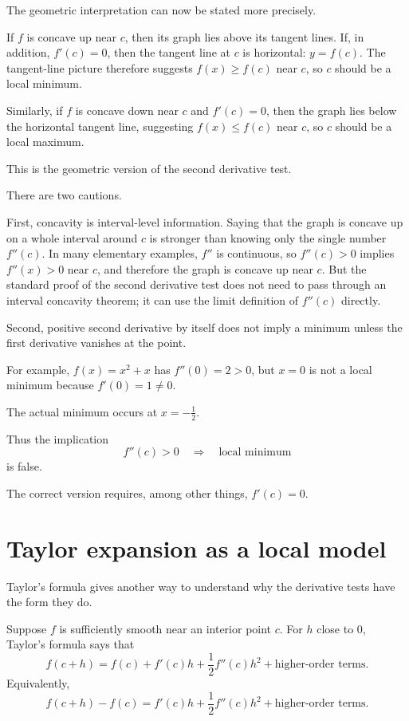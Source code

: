 \documentclass{essay}
\begin{document}
The geometric interpretation can now be stated more precisely.

If \(f\) is concave up near \(c\), then its graph lies above its tangent lines. If, in addition, \(f'(c)=0\), then the tangent line at \(c\) is horizontal: \(y=f(c)\). The tangent-line picture therefore suggests \(f(x)\geq f(c)\) near \(c\), so \(c\) should be a local minimum.

Similarly, if \(f\) is concave down near \(c\) and \(f'(c)=0\), then the graph lies below the horizontal tangent line, suggesting \(f(x)\leq f(c)\) near \(c\), so \(c\) should be a local maximum.

This is the geometric version of the second derivative test.

There are two cautions.

First, concavity is interval-level information. Saying that the graph is concave up on a whole interval around \(c\) is stronger than knowing only the single number \(f''(c)\). In many elementary examples, \(f''\) is continuous, so \(f''(c)>0\) implies \(f''(x)>0\) near \(c\), and therefore the graph is concave up near \(c\). But the standard proof of the second derivative test does not need to pass through an interval concavity theorem; it can use the limit definition of \(f''(c)\) directly.

Second, positive second derivative by itself does not imply a minimum unless the first derivative vanishes at the point.

For example, \(f(x)=x^2+x\) has \(f''(0)=2>0\), but \(x=0\) is not a local minimum because \(f'(0)=1\neq0\).

The actual minimum occurs at \(x=-\frac12\).

Thus the implication
\[
f''(c)>0
\quad\Longrightarrow\quad
\text{local minimum}
\]
is false.

The correct version requires, among other things, \(f'(c)=0\).

\section{Taylor expansion as a local model}

Taylor's formula gives another way to understand why the derivative tests have the form they do.

Suppose \(f\) is sufficiently smooth near an interior point \(c\). For \(h\) close to \(0\), Taylor's formula says that
\[
f(c+h)
=
f(c)
+
f'(c)h
+
\frac12 f''(c)h^2
+
\text{higher-order terms}.
\]
Equivalently,
\[
f(c+h)-f(c)
=
f'(c)h
+
\frac12 f''(c)h^2
+
\text{higher-order terms}.
\]
\end{document}
